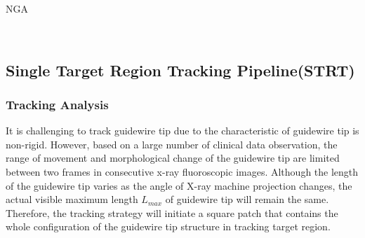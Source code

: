 \documentclass[letterpaper, 10 pt, conference]{ieeeconf}  %
\begin{document}
\begin{algorithm}[!htbp]
\setlength{\abovedisplayskip}{3pt}
\setlength{\belowdisplayskip}{-3pt}
	\caption{NGA}
		\
		\
\end{algorithm}

\subsection{Single Target Region Tracking Pipeline(STRT)} 

\subsubsection{Tracking Analysis}
It is challenging to track guidewire tip due to the characteristic of guidewire tip is non-rigid. However, based on a large number of clinical data observation, the range of movement and morphological change of the guidewire tip are limited between two frames in consecutive x-ray fluoroscopic images. Although the length of the guidewire tip varies as the angle of X-ray machine projection changes, the actual visible maximum length $L_{max}$ of guidewire tip will remain the same. Therefore, the tracking strategy will initiate a square patch that contains the whole configuration of the guidewire tip structure in tracking target region. 
\end{document}
